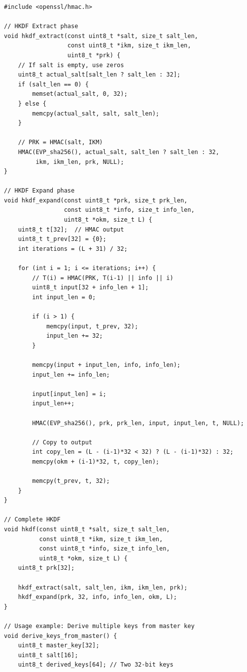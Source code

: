 \begin{lstlisting}[style=cstyle, caption={HKDF Implementation}]
#include <openssl/hmac.h>

// HKDF Extract phase
void hkdf_extract(const uint8_t *salt, size_t salt_len,
                  const uint8_t *ikm, size_t ikm_len,
                  uint8_t *prk) {
    // If salt is empty, use zeros
    uint8_t actual_salt[salt_len ? salt_len : 32];
    if (salt_len == 0) {
        memset(actual_salt, 0, 32);
    } else {
        memcpy(actual_salt, salt, salt_len);
    }
    
    // PRK = HMAC(salt, IKM)
    HMAC(EVP_sha256(), actual_salt, salt_len ? salt_len : 32,
         ikm, ikm_len, prk, NULL);
}

// HKDF Expand phase
void hkdf_expand(const uint8_t *prk, size_t prk_len,
                 const uint8_t *info, size_t info_len,
                 uint8_t *okm, size_t L) {
    uint8_t t[32];  // HMAC output
    uint8_t t_prev[32] = {0};
    int iterations = (L + 31) / 32;
    
    for (int i = 1; i <= iterations; i++) {
        // T(i) = HMAC(PRK, T(i-1) || info || i)
        uint8_t input[32 + info_len + 1];
        int input_len = 0;
        
        if (i > 1) {
            memcpy(input, t_prev, 32);
            input_len += 32;
        }
        
        memcpy(input + input_len, info, info_len);
        input_len += info_len;
        
        input[input_len] = i;
        input_len++;
        
        HMAC(EVP_sha256(), prk, prk_len, input, input_len, t, NULL);
        
        // Copy to output
        int copy_len = (L - (i-1)*32 < 32) ? (L - (i-1)*32) : 32;
        memcpy(okm + (i-1)*32, t, copy_len);
        
        memcpy(t_prev, t, 32);
    }
}

// Complete HKDF
void hkdf(const uint8_t *salt, size_t salt_len,
          const uint8_t *ikm, size_t ikm_len,
          const uint8_t *info, size_t info_len,
          uint8_t *okm, size_t L) {
    uint8_t prk[32];
    
    hkdf_extract(salt, salt_len, ikm, ikm_len, prk);
    hkdf_expand(prk, 32, info, info_len, okm, L);
}

// Usage example: Derive multiple keys from master key
void derive_keys_from_master() {
    uint8_t master_key[32];
    uint8_t salt[16];
    uint8_t derived_keys[64]; // Two 32-bit keys
    

\end{lstlisting}
